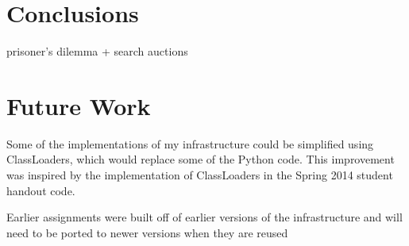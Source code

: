 \documentclass[pageno]{jpaper}
\begin{document}
\section*{Conclusions}
prisoner's dilemma + search auctions

\section*{Future Work}

Some of the implementations of my infrastructure could be simplified using ClassLoaders, which would replace some of the Python code.
This improvement was inspired by the implementation of ClassLoaders in the Spring 2014 student handout code.

Earlier assignments were built off of earlier versions of the infrastructure and will need to be ported to newer versions when they are reused
\end{document}
